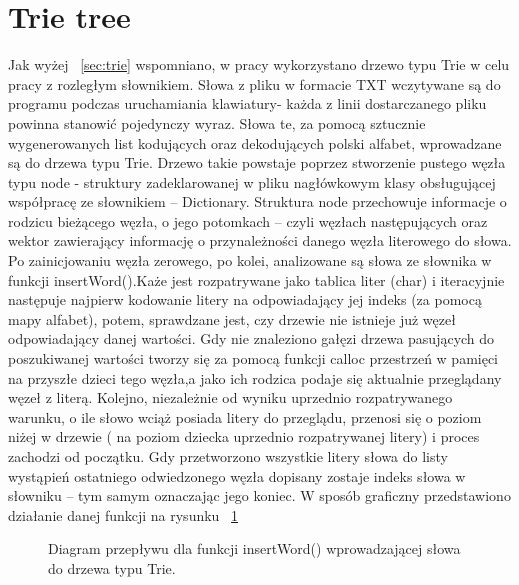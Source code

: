 \documentclass[twoside,a4paper]{book}
\begin{document}
\section{Trie tree}\label{sec:trietree}
Jak wyżej ~\ref{sec:trie}  wspomniano, w pracy wykorzystano drzewo typu Trie w celu pracy z rozległym słownikiem. Słowa z pliku w formacie TXT wczytywane są do programu podczas uruchamiania klawiatury- każda z linii dostarczanego pliku powinna stanowić pojedynczy wyraz. Słowa te, za pomocą sztucznie wygenerowanych list kodujących oraz dekodujących polski alfabet, wprowadzane są do drzewa typu Trie. Drzewo takie powstaje poprzez stworzenie pustego węzła typu node - struktury zadeklarowanej w pliku nagłówkowym klasy obsługującej współpracę ze słownikiem – Dictionary. Struktura node przechowuje informacje o rodzicu bieżącego węzła, o jego potomkach – czyli węzłach następujących oraz wektor zawierający informację o przynależności danego węzła literowego do słowa. 
Po zainicjowaniu węzła zerowego, po kolei, analizowane są słowa ze słownika w funkcji insertWord().Każe jest rozpatrywane jako tablica liter (char) i iteracyjnie następuje najpierw kodowanie litery na odpowiadający jej indeks (za pomocą  mapy alfabet), potem, sprawdzane jest, czy drzewie nie istnieje już węzeł odpowiadający danej wartości. Gdy nie znaleziono gałęzi drzewa pasujących do poszukiwanej wartości tworzy się za pomocą funkcji calloc przestrzeń w pamięci na przyszłe dzieci tego węzła,a jako ich rodzica podaje się aktualnie przeglądany węzeł z literą. Kolejno, niezależnie od wyniku uprzednio rozpatrywanego warunku, o ile słowo wciąż posiada litery do przeglądu, przenosi się o poziom niżej w drzewie ( na poziom dziecka  uprzednio rozpatrywanej litery) i proces zachodzi od początku.  Gdy przetworzono wszystkie litery słowa do listy wystąpień ostatniego odwiedzonego węzła dopisany zostaje indeks słowa w słowniku – tym samym oznaczając jego koniec. W sposób graficzny przedstawiono działanie danej funkcji na rysunku ~\ref{fig:insertWord}
\begin{figure}[!h]
		\centering
		\caption{Diagram przepływu dla funkcji insertWord() wprowadzającej słowa do drzewa typu Trie. }
		\label{fig:insertWord}
\end{figure}
\end{document}
